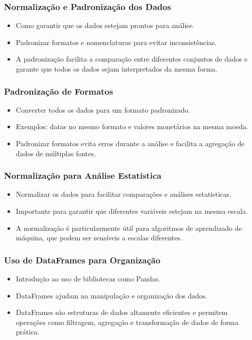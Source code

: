 \documentclass{beamer}
\begin{document}
\begin{frame}
  \frametitle{Normalização e Padronização dos Dados}
  \begin{itemize}
    \item Como garantir que os dados estejam prontos para análise.
    \item Padronizar formatos e nomenclaturas para evitar inconsistências.
    \item A padronização facilita a comparação entre diferentes conjuntos de dados e garante que todos os dados sejam interpretados da mesma forma.
  \end{itemize}
\end{frame}

\begin{frame}
  \frametitle{Padronização de Formatos}
  \begin{itemize}
    \item Converter todos os dados para um formato padronizado.
    \item Exemplos: datas no mesmo formato e valores monetários na mesma moeda.
    \item Padronizar formatos evita erros durante a análise e facilita a agregação de dados de múltiplas fontes.
  \end{itemize}
\end{frame}

\begin{frame}
  \frametitle{Normalização para Análise Estatística}
  \begin{itemize}
    \item Normalizar os dados para facilitar comparações e análises estatísticas.
    \item Importante para garantir que diferentes variáveis estejam na mesma escala.
    \item A normalização é particularmente útil para algoritmos de aprendizado de máquina, que podem ser sensíveis a escalas diferentes.
  \end{itemize}
\end{frame}

\begin{frame}
  \frametitle{Uso de DataFrames para Organização}
  \begin{itemize}
    \item Introdução ao uso de bibliotecas como Pandas.
    \item DataFrames ajudam na manipulação e organização dos dados.
    \item DataFrames são estruturas de dados altamente eficientes e permitem operações como filtragem, agregação e transformação de dados de forma prática.
  \end{itemize}
\end{frame}
\end{document}
